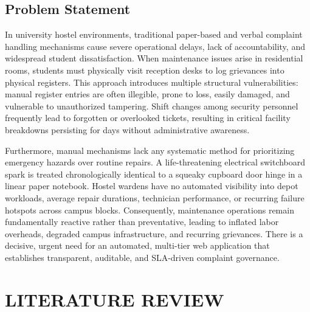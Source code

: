 \documentclass[10pt]{report}
\begin{document}
\section{Problem Statement}
\hspace{0.5cm}In university hostel environments, traditional paper-based and verbal complaint handling mechanisms cause severe operational delays, lack of accountability, and widespread student dissatisfaction. When maintenance issues arise in residential rooms, students must physically visit reception desks to log grievances into physical registers. This approach introduces multiple structural vulnerabilities: manual register entries are often illegible, prone to loss, easily damaged, and vulnerable to unauthorized tampering. Shift changes among security personnel frequently lead to forgotten or overlooked tickets, resulting in critical facility breakdowns persisting for days without administrative awareness.

Furthermore, manual mechanisms lack any systematic method for prioritizing emergency hazards over routine repairs. A life-threatening electrical switchboard spark is treated chronologically identical to a squeaky cupboard door hinge in a linear paper notebook. Hostel wardens have no automated visibility into depot workloads, average repair durations, technician performance, or recurring failure hotspots across campus blocks. Consequently, maintenance operations remain fundamentally reactive rather than preventative, leading to inflated labor overheads, degraded campus infrastructure, and recurring grievances. There is a decisive, urgent need for an automated, multi-tier web application that establishes transparent, auditable, and SLA-driven complaint governance.

\chapter{LITERATURE REVIEW}
\linespread{1.5}
\end{document}

